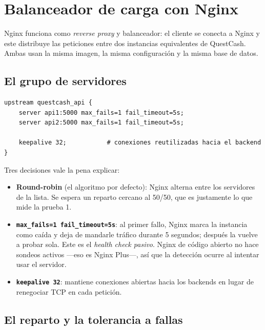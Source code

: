 \documentclass[11pt,letterpaper]{article}
\begin{document}
\section{Balanceador de carga con Nginx}

Nginx funciona como \emph{reverse proxy} y balanceador: el cliente se conecta a
Nginx y este distribuye las peticiones entre dos instancias equivalentes de
QuestCash. Ambas usan la misma imagen, la misma configuración y la misma base de
datos.

\subsection{El grupo de servidores}

\begin{lstlisting}[style=conf,language=nginxconf,caption={\texttt{nginx.conf} — definición del \emph{upstream}.}]
upstream questcash_api {
    server api1:5000 max_fails=1 fail_timeout=5s;
    server api2:5000 max_fails=1 fail_timeout=5s;

    keepalive 32;           # conexiones reutilizadas hacia el backend
}
\end{lstlisting}

\noindent Tres decisiones vale la pena explicar:

\begin{itemize}[leftmargin=1.4em,itemsep=4pt]
  \item \textbf{Round-robin} (el algoritmo por defecto): Nginx alterna entre los
        servidores de la lista. Se espera un reparto cercano al 50/50, que es
        justamente lo que mide la prueba 1.
  \item \textbf{\texttt{max\_fails=1 fail\_timeout=5s}}: al primer fallo, Nginx
        marca la instancia como caída y deja de mandarle tráfico durante 5
        segundos; después la vuelve a probar sola. Este es el \emph{health check
        pasivo}. Nginx de código abierto no hace sondeos activos —eso es Nginx
        Plus—, así que la detección ocurre al intentar usar el servidor.
  \item \textbf{\texttt{keepalive 32}}: mantiene conexiones abiertas hacia los
        backends en lugar de renegociar TCP en cada petición.
\end{itemize}

\subsection{El reparto y la tolerancia a fallas}
\end{document}
